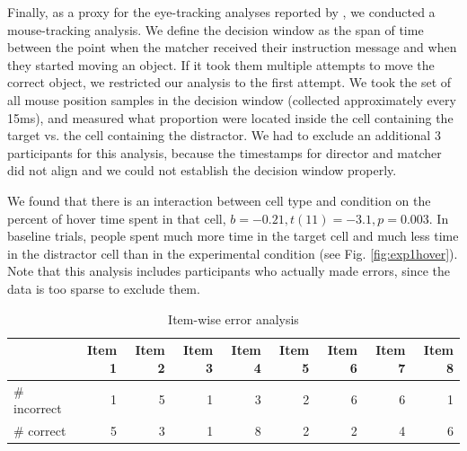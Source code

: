 \documentclass[10pt,letterpaper]{article}
\begin{document}
Finally, as a proxy for the eye-tracking analyses reported by , we conducted a mouse-tracking analysis. We define the decision window as the span of time between the point when the matcher received their instruction message and when they started moving an object. If it took them multiple attempts to move the correct object, we restricted our analysis to the first attempt. We took the set of all mouse position samples in the decision window (collected approximately every 15ms), and measured what proportion were located inside the cell containing the target vs. the cell containing the distractor.  We had to exclude an additional 3 participants for this analysis, because the timestamps for director and matcher did not align and we could not establish the decision window properly.

We found that there is an interaction between cell type and condition on the percent of hover time spent in that cell, $b = -0.21, t(11) = -3.1, p = 0.003$. In baseline trials, people spent much more time in the target cell and much less time in the distractor cell than in the experimental condition (see Fig. \ref{fig:exp1hover}). Note that this analysis includes participants who actually made errors, since the data is too sparse to exclude them. %

\begin{table}
\begin{center}
\begin{tabular}{ p{2cm} | r | r |  r | r | r | r | r | r |}
& Item 1 & Item 2 & Item 3 & Item 4 & Item 5 & Item 6 & Item 7 & Item 8\\\hline
\# incorrect & 1 & 5 & 1 & 3 & 2 &6 & 6 & 1 \\ 
\# correct & 5 & 3 & 1 & 8 & 2 & 2 & 4 & 6 \\
\end{tabular}
\caption{Item-wise error analysis}
\label{table:exp1ItemWise}
\end{center}
\end{table}
\end{document}
